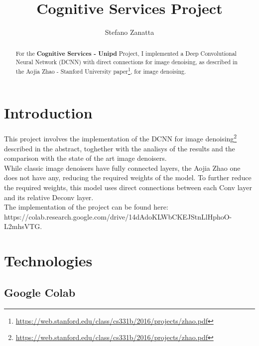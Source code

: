 \documentclass[twocolumn,showpacs,%
  nofootinbib,aps,superscriptaddress,%
  eqsecnum,prd,notitlepage,showkeys,10pt]{revtex4-1}
\begin{document}
\title{Cognitive Services Project}
\author{Stefano Zanatta}

\begin{abstract}
For the \textbf{Cognitive Services - Unipd} Project, I implemented a Deep Convolutional Neural Network (DCNN) with direct connections for image denoising, as described in the Aojia Zhao - Stanford University paper\footnote{\url{https://web.stanford.edu/class/cs331b/2016/projects/zhao.pdf}}, for image denoising.
\end{abstract}

\maketitle

\section{Introduction}
\label{sec:introduction}
This project involves the implementation of the DCNN for image denoising\footnote{\url{https://web.stanford.edu/class/cs331b/2016/projects/zhao.pdf}} described in the abstract, toghether with the analisys of the results and the comparison with the state of the art image denoisers.\\
While classic image denoisers have fully connected layers, the Aojia Zhao one does not have any, reducing the required weights of the model. To further reduce the required weights, this model uses direct connections between each Conv layer and its relative Deconv layer.\\
The implementation of the project can be found here: https://colab.research.google.com/drive/14dAdoKLWbCKEJStnLlHphoO-L2mhsVTG.

\section{Technologies}
\label{sec:technologies}

\subsection{Google Colab}
\label{subsec:colab}
\end{document}
